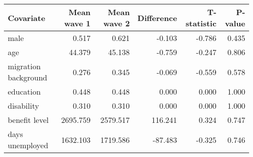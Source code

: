 
\begin{tabular}{lrrrrr}
\toprule
Covariate & Mean wave 1 & Mean wave 2 & Difference & T-statistic & P-value\\
\midrule
male & 0.517 & 0.621 & -0.103 & -0.786 & 0.435\\
age & 44.379 & 45.138 & -0.759 & -0.247 & 0.806\\
migration background & 0.276 & 0.345 & -0.069 & -0.559 & 0.578\\
education & 0.448 & 0.448 & 0.000 & 0.000 & 1.000\\
disability & 0.310 & 0.310 & 0.000 & 0.000 & 1.000\\
benefit level & 2695.759 & 2579.517 & 116.241 & 0.324 & 0.747\\
days unemployed & 1632.103 & 1719.586 & -87.483 & -0.325 & 0.746\\
\bottomrule
\end{tabular}
